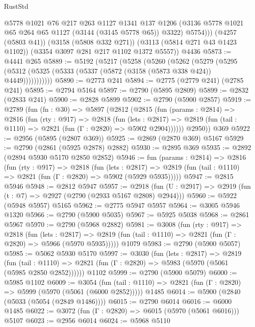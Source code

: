 \begin{lexlean}{RustStd}
\begin{coremodule}
{\begin{coremodule}
{{{{{{{{{{{{{{{{{{{{{{{{{{            @5778
            @1021
            @76
            @217
            @263
            @1127
            @1341
            @137
            @1206
            (@3136 @5778 @1021 @65 @264 @65 @1127 (@3144 (@3145 @5778 @65)) @3322)
            @5754)))
      (@4257 (@5803 @41))
      (@3158 (@5808 @332 @271))
      (@3113 (@5814 @271 @43 @1423 @1102))
      (@3354 @3097 @281 @217 @1102 @1372 @5557))
    @4436
@5873 := @4441 @265
@5889 := @5192
    (@5217
      (@5258
        (@5260
          (@5262
            (@5279
              (@5295 (@5312 (@5325 (@5333 (@5337 (@5872 (@3158 (@5873 @338 @424)) @4449)))))))))))
@5890 := @2773 @241
@5894 := @2775 (@2779 @241) (@2785 @241)
@5895 := @2794 @5164
@5897 := @2790 (@5895 @2809)
@5899 := @2832 (@2833 @241)
@5900 := @2828 @5899
@5902 := @2790 (@5900 @2857)
@5919 := @2789
    (fun (fn : @30) =>
    @5897
      (@2812
        (@2815
          (fun (params : @2814) =>
          @2816
            (fun (rty : @917) =>
            @2818
              (fun (lets : @2817) =>
              @2819 (fun (tail : @1110) => @2821 (fun (Γ : @2820) => @5902 @2904))))))
        @2950))
    @369
@5922 := @2956 (@5895 (@2807 @369))
@5925 := @2869 (@2870 @369) @5167
@5929 := @2790 (@2861 (@5925 @2878) @2882)
@5930 := @2895 @369
@5935 := @2892 (@2894 @5930 @5170 @2850 @2852)
@5946 := fun (params : @2814) =>
  @2816
    (fun (rty : @917) =>
    @2818
      (fun (lets : @2817) =>
      @2819 (fun (tail : @1110) => @2821 (fun (Γ : @2820) => @5902 (@5929 @5935)))))
@5947 := @2815 @5946
@5948 := @2812 @5947
@5957 := @2918 (fun (U : @2917) => @2919 (fun (t : @7) => @2927 (@2790 (@2933 @5167 @2808) @2944)))
@5960 := @5922 (@5948 @5957) @5165
@5962 := @2775 @5947 @5957
@5964 := @3005 @5946 @1320
@5966 := @2790 (@5900 @5035)
@5967 := @5925 @5038
@5968 := @2861 @5967
@5970 := @2790 (@5968 @2882)
@5981 := @3008
    (fun (rty : @917) =>
    @2818
      (fun (lets : @2817) =>
      @2819 (fun (tail : @1110) => @2821 (fun (Γ : @2820) => @5966 (@5970 @5935)))))
    @1079
@5983 := @2790 (@5900 @5057)
@5985 := @5062 @5930 @5170
@5997 := @3030
    (fun (lets : @2817) =>
    @2819
      (fun (tail : @1110) => @2821 (fun (Γ : @2820) => @5983 (@5970 (@5061 (@5985 @2850 @2852))))))
    @1102
@5999 := @2790 (@5900 @5079)
@6000 := @5985 @1102
@6009 := @3054
    (fun (tail : @1110) => @2821 (fun (Γ : @2820) => @5999 (@5970 (@5061 (@6000 @2852)))))
    @1485
@6014 := @5900 (@2840 (@5033 (@5054 (@2849 @1486))))
@6015 := @2790 @6014
@6016 := @6000 @1485
@6022 := @3072 (fun (Γ : @2820) => @6015 (@5970 (@5061 @6016))) @5107
@6023 := @2956 @6014
@6024 := @5968 @5110
}}}}}}}}}}}}}}}}}}}}}}}}}}
\end{coremodule}}
\end{coremodule}
\end{lexlean}
